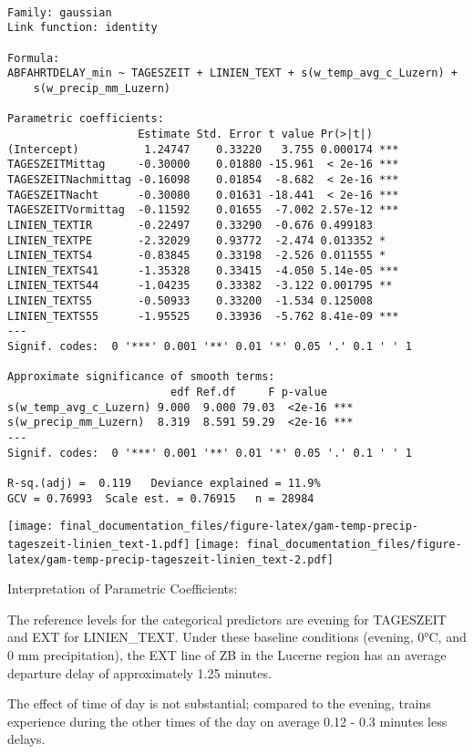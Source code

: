 \documentclass[
]{article}
\begin{document}
\begin{verbatim}

Family: gaussian 
Link function: identity 

Formula:
ABFAHRTDELAY_min ~ TAGESZEIT + LINIEN_TEXT + s(w_temp_avg_c_Luzern) + 
    s(w_precip_mm_Luzern)

Parametric coefficients:
                    Estimate Std. Error t value Pr(>|t|)    
(Intercept)          1.24747    0.33220   3.755 0.000174 ***
TAGESZEITMittag     -0.30000    0.01880 -15.961  < 2e-16 ***
TAGESZEITNachmittag -0.16098    0.01854  -8.682  < 2e-16 ***
TAGESZEITNacht      -0.30080    0.01631 -18.441  < 2e-16 ***
TAGESZEITVormittag  -0.11592    0.01655  -7.002 2.57e-12 ***
LINIEN_TEXTIR       -0.22497    0.33290  -0.676 0.499183    
LINIEN_TEXTPE       -2.32029    0.93772  -2.474 0.013352 *  
LINIEN_TEXTS4       -0.83845    0.33198  -2.526 0.011555 *  
LINIEN_TEXTS41      -1.35328    0.33415  -4.050 5.14e-05 ***
LINIEN_TEXTS44      -1.04235    0.33382  -3.122 0.001795 ** 
LINIEN_TEXTS5       -0.50933    0.33200  -1.534 0.125008    
LINIEN_TEXTS55      -1.95525    0.33936  -5.762 8.41e-09 ***
---
Signif. codes:  0 '***' 0.001 '**' 0.01 '*' 0.05 '.' 0.1 ' ' 1

Approximate significance of smooth terms:
                         edf Ref.df     F p-value    
s(w_temp_avg_c_Luzern) 9.000  9.000 79.03  <2e-16 ***
s(w_precip_mm_Luzern)  8.319  8.591 59.29  <2e-16 ***
---
Signif. codes:  0 '***' 0.001 '**' 0.01 '*' 0.05 '.' 0.1 ' ' 1

R-sq.(adj) =  0.119   Deviance explained = 11.9%
GCV = 0.76993  Scale est. = 0.76915   n = 28984
\end{verbatim}

\texttt{[image: final\_documentation\_files/figure-latex/gam-temp-precip-tageszeit-linien\_text-1.pdf]}
\texttt{[image: final\_documentation\_files/figure-latex/gam-temp-precip-tageszeit-linien\_text-2.pdf]}

Interpretation of Parametric Coefficients:

The reference levels for the categorical predictors are evening for
TAGESZEIT and EXT for LINIEN\_TEXT. Under these baseline conditions
(evening, 0°C, and 0 mm precipitation), the EXT line of ZB in the
Lucerne region has an average departure delay of approximately 1.25
minutes.

The effect of time of day is not substantial; compared to the evening,
trains experience during the other times of the day on average 0.12 -
0.3 minutes less delays.
\end{document}
